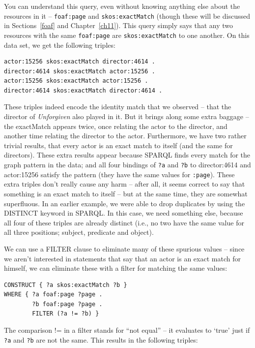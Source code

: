 \begin{challenge}
You can understand this query, even without knowing anything else about
the resources in it -- \texttt{foaf:page} and \texttt{skos:exactMatch} (though these will
be discussed in Sections~\ref{foaf} and Chapter~\ref{ch11}). This query simply says that any two
resources with the same \texttt{foaf:page} are \texttt{skos:exactMatch} to one another. On
this data set, we get the following triples:

\begin{lstlisting}
actor:15256 skos:exactMatch director:4614 .
director:4614 skos:exactMatch actor:15256 .
actor:15256 skos:exactMatch actor:15256 .
director:4614 skos:exactMatch director:4614 .
\end{lstlisting}

These triples indeed encode the identity match that we observed -- that
the director of \emph{Unforgiven} also played in it. But it brings along
some extra baggage -- the exactMatch appears twice, once relating the
actor to the director, and another time relating the director to the
actor. Furthermore, we have two rather trivial results, that every actor
is an exact match to itself (and the same for directors). These extra
results appear because SPARQL finds every match for the graph pattern in
the data; and all four bindings of \texttt{?a} and \texttt{?b} to director:4614 and
actor:15256 satisfy the pattern (they have the same values for \texttt{:page}).
These extra triples don't really cause any harm -- after all, it seems
correct to say that something is an exact match to itself -- but at the
same time, they are somewhat superfluous. In an earlier example, we were
able to drop duplicates by using the DISTINCT keyword in SPARQL. In this
case, we need something else, because  all four of these triples are
already distinct (i.e., no two have the same value for all three
positions; subject, predicate and object).

We can use a FILTER clause to eliminate many of these spurious values --
since we aren't interested in statements that say that an actor is an
exact match for himself, we can eliminate these with a filter for
matching the same values:

\begin{lstlisting}
CONSTRUCT { ?a skos:exactMatch ?b }
WHERE { ?a foaf:page ?page . 
        ?b foaf:page ?page .
        FILTER (?a != ?b) }
\end{lstlisting}

The comparison != in a filter stands for ``not equal'' -- it evaluates
to `true' just if \texttt{?a} and \texttt{?b} are not the same. This results in the
following triples:


\end{challenge}
